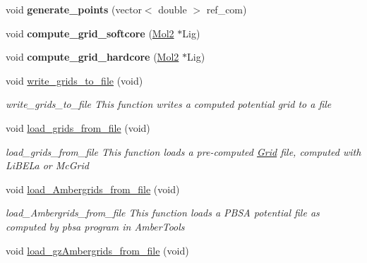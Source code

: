 \begin{DoxyCompactItemize}
\item 
\hypertarget{classGrid_adb6ec86ee0d27eac8db4ca21448180ef}{
void {\bfseries generate\_\-points} (vector$<$ double $>$ ref\_\-com)}
\label{classGrid_adb6ec86ee0d27eac8db4ca21448180ef}

\item 
\hypertarget{classGrid_ac3c7a81802cc07438eafea1be61adc50}{
void {\bfseries compute\_\-grid\_\-softcore} (\hyperlink{classMol2}{Mol2} $\ast$Lig)}
\label{classGrid_ac3c7a81802cc07438eafea1be61adc50}

\item 
\hypertarget{classGrid_acbed039de7f2a39c7d055be9fae33b98}{
void {\bfseries compute\_\-grid\_\-hardcore} (\hyperlink{classMol2}{Mol2} $\ast$Lig)}
\label{classGrid_acbed039de7f2a39c7d055be9fae33b98}

\item 
\hypertarget{classGrid_ace6f59f2bbe699b976abbc69580c6a43}{
void \hyperlink{classGrid_ace6f59f2bbe699b976abbc69580c6a43}{write\_\-grids\_\-to\_\-file} (void)}
\label{classGrid_ace6f59f2bbe699b976abbc69580c6a43}

\begin{DoxyCompactList}\small\item\em write\_\-grids\_\-to\_\-file This function writes a computed potential grid to a file \item\end{DoxyCompactList}\item 
\hypertarget{classGrid_a961421fbd6b11add9ef00f06421cae33}{
void \hyperlink{classGrid_a961421fbd6b11add9ef00f06421cae33}{load\_\-grids\_\-from\_\-file} (void)}
\label{classGrid_a961421fbd6b11add9ef00f06421cae33}

\begin{DoxyCompactList}\small\item\em load\_\-grids\_\-from\_\-file This function loads a pre-\/computed \hyperlink{classGrid}{Grid} file, computed with LiBELa or McGrid \item\end{DoxyCompactList}\item 
\hypertarget{classGrid_af6fc553fde4b02c37ff34959a6b8cb78}{
void \hyperlink{classGrid_af6fc553fde4b02c37ff34959a6b8cb78}{load\_\-Ambergrids\_\-from\_\-file} (void)}
\label{classGrid_af6fc553fde4b02c37ff34959a6b8cb78}

\begin{DoxyCompactList}\small\item\em load\_\-Ambergrids\_\-from\_\-file This function loads a PBSA potential file as computed by pbsa program in AmberTools \item\end{DoxyCompactList}\item 
\hypertarget{classGrid_ad437ef7d546b3559e5cbb151da149deb}{
void \hyperlink{classGrid_ad437ef7d546b3559e5cbb151da149deb}{load\_\-gzAmbergrids\_\-from\_\-file} (void)}
\label{classGrid_ad437ef7d546b3559e5cbb151da149deb}


\end{DoxyCompactItemize}
